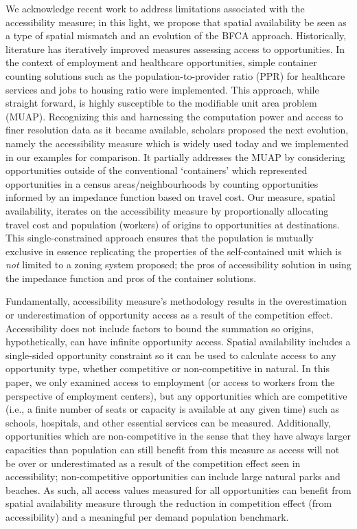 \documentclass[]{elsarticle} %
\begin{document}
We acknowledge recent work to address limitations associated with the
accessibility measure; in this light, we propose that spatial
availability be seen as a type of spatial mismatch and an evolution of
the BFCA approach. Historically, literature has iteratively improved
measures assessing access to opportunities. In the context of employment
and healthcare opportunities, simple container counting solutions such
as the population-to-provider ratio (PPR) for healthcare services and
jobs to housing ratio were implemented. This approach, while straight
forward, is highly susceptible to the modifiable unit area problem
(MUAP). Recognizing this and harnessing the computation power and access
to finer resolution data as it became available, scholars proposed the
next evolution, namely the accessibility measure which is widely used
today and we implemented in our examples for comparison. It partially
addresses the MUAP by considering opportunities outside of the
conventional `containers' which represented opportunities in a census
areas/neighbourhoods by counting opportunities informed by an impedance
function based on travel cost. Our measure, spatial availability,
iterates on the accessibility measure by proportionally allocating
travel cost and population (workers) of origins to opportunities at
destinations. This single-constrained approach ensures that the
population is mutually exclusive in essence replicating the properties
of the self-contained unit which is \emph{not} limited to a zoning
system proposed; the pros of accessibility solution in using the
impedance function and pros of the container solutions.

Fundamentally, accessibility measure's methodology results in the
overestimation or underestimation of opportunity access as a result of
the competition effect. Accessibility does not include factors to bound
the summation so origins, hypothetically, can have infinite opportunity
access. Spatial availability includes a single-sided opportunity
constraint so it can be used to calculate access to any opportunity
type, whether competitive or non-competitive in natural. In this paper,
we only examined access to employment (or access to workers from the
perspective of employment centers), but any opportunities which are
competitive (i.e., a finite number of seats or capacity is available at
any given time) such as schools, hospitals, and other essential services
can be measured. Additionally, opportunities which are non-competitive
in the sense that they have always larger capacities than population can
still benefit from this measure as access will not be over or
underestimated as a result of the competition effect seen in
accessibility; non-competitive opportunities can include large natural
parks and beaches. As such, all access values measured for all
opportunities can benefit from spatial availability measure through the
reduction in competition effect (from accessibility) and a meaningful
per demand population benchmark.
\end{document}
